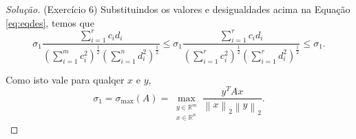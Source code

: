 \documentclass[a4paper,10pt]{article}
\newenvironment{solution}
  {\begin{proof}[Solução]}
  {\end{proof}}
\newcommand{\norm}[1]{\left\lVert#1\right\rVert}
\begin{document}
\begin{solution}{(Exercício 6)}
    Substituindos os valores e desigualdades acima na Equação \eqref{eq:eqdes},
    temos que
    \begin{equation*}
      \sigma_1 \dfrac{\sum_{i=1}^{r} c_i d_i}{ \left( \sum_{i=1}^{m} c_i^2 \right)^{\frac{1}{2}}
      \left(\sum_{i=1}^{n} d_i^2 \right)^{\frac{1}{2}} } \leq
      \sigma_1 \dfrac{\sum_{i=1}^{r} c_i d_i}{ \left( \sum_{i=1}^{r} c_i^2 \right)^{\frac{1}{2}}
      \left(\sum_{i=1}^{r} d_i^2 \right)^{\frac{1}{2}} } \leq \sigma_1.
    \end{equation*}

    Como isto vale para qualqer $x$ e $y$,
    \begin{equation*}
      \sigma_1 = \sigma_{\max}(A) = \max_{\substack{y \in \mathbb{R}^m \\ x \in \mathbb{R}^n}}
      \frac{y^TAx}{\norm{x}_2\norm{y}_2}.
    \end{equation*}
  \end{solution}
\end{document}

